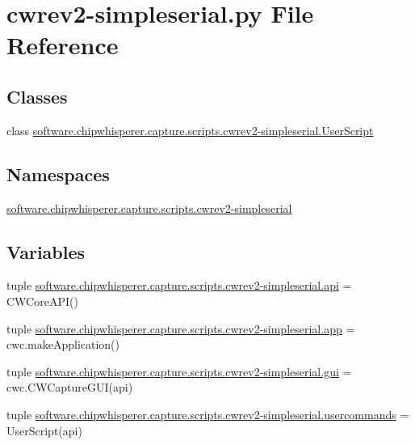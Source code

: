 \hypertarget{cwrev2-simpleserial_8py}{}\section{cwrev2-\/simpleserial.py File Reference}
\label{cwrev2-simpleserial_8py}
\subsection*{Classes}
\begin{DoxyCompactItemize}
\item 
class \hyperlink{classsoftware_1_1chipwhisperer_1_1capture_1_1scripts_1_1cwrev2-simpleserial_1_1UserScript}{software.\+chipwhisperer.\+capture.\+scripts.\+cwrev2-\/simpleserial.\+User\+Script}
\end{DoxyCompactItemize}
\subsection*{Namespaces}
\begin{DoxyCompactItemize}
\item 
 \hyperlink{namespacesoftware_1_1chipwhisperer_1_1capture_1_1scripts_1_1cwrev2-simpleserial}{software.\+chipwhisperer.\+capture.\+scripts.\+cwrev2-\/simpleserial}
\end{DoxyCompactItemize}
\subsection*{Variables}
\begin{DoxyCompactItemize}
\item 
tuple \hyperlink{namespacesoftware_1_1chipwhisperer_1_1capture_1_1scripts_1_1cwrev2-simpleserial_a36e76f76504a84a1ed68d84e52ce89df}{software.\+chipwhisperer.\+capture.\+scripts.\+cwrev2-\/simpleserial.\+api} = C\+W\+Core\+A\+P\+I()
\item 
tuple \hyperlink{namespacesoftware_1_1chipwhisperer_1_1capture_1_1scripts_1_1cwrev2-simpleserial_a2d080c6222c227c490bbbf578b071094}{software.\+chipwhisperer.\+capture.\+scripts.\+cwrev2-\/simpleserial.\+app} = cwc.\+make\+Application()
\item 
tuple \hyperlink{namespacesoftware_1_1chipwhisperer_1_1capture_1_1scripts_1_1cwrev2-simpleserial_ab7992844ddd95ba04f36cd5e2470c863}{software.\+chipwhisperer.\+capture.\+scripts.\+cwrev2-\/simpleserial.\+gui} = cwc.\+C\+W\+Capture\+G\+U\+I(api)
\item 
tuple \hyperlink{namespacesoftware_1_1chipwhisperer_1_1capture_1_1scripts_1_1cwrev2-simpleserial_a8fcc42cd9e176fb37ab73180811fd7b4}{software.\+chipwhisperer.\+capture.\+scripts.\+cwrev2-\/simpleserial.\+usercommands} = User\+Script(api)
\end{DoxyCompactItemize}
